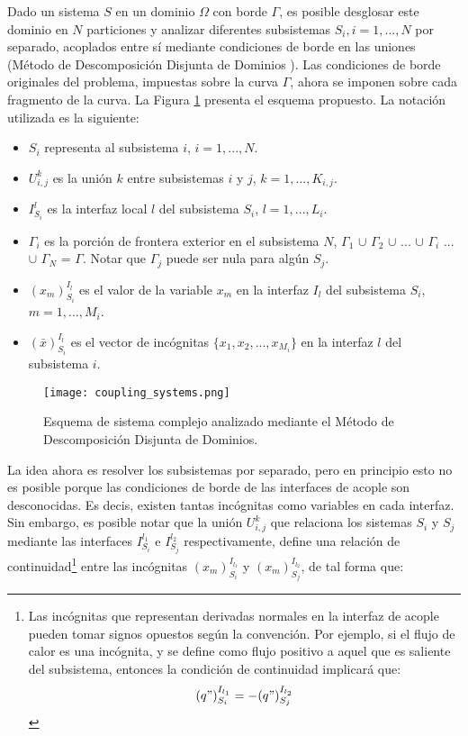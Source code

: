 Dado un sistema $S$ en un dominio $\Omega$ con borde $\Gamma$, es posible desglosar este dominio en $N$ particiones 
y analizar diferentes subsistemas $S_i,i=1,...,N$ por separado, acoplados entre sí mediante condiciones de borde en las uniones
(Método de Descomposición Disjunta de Dominios \cite{ddmethod}).
Las condiciones de borde originales del problema, impuestas sobre la curva $\Gamma$,
ahora se imponen sobre cada fragmento de la curva.
La Figura \ref{esquema-acoplamiento} presenta el esquema propuesto.
La notación utilizada es la siguiente:
\begin{itemize}
\item $S_i$ representa al subsistema $i$, $i=1,...,N$.
\item $U_{i,j}^k$ es la unión $k$ entre subsistemas $i$ y $j$, $k=1,...,K_{i,j}$.
\item $I_{S_i}^{l}$ es la interfaz local $l$ del subsistema $S_i$, $l=1,...,L_i$.
\item $\Gamma_i$ es la porción de frontera exterior en el subsistema $N$,
 $\Gamma_1$ $\cup$ $\Gamma_2$ $\cup$ ... $\cup$ $\Gamma_i$ ...  $\cup$ $\Gamma_N$ = $\Gamma$.
 Notar que $\Gamma_j$ puede ser nula para algún $S_j$.
\item ${(x_m)_{S_i}^{I_l}}$ es el valor de la variable $x_m$ en la interfaz ${I_l}$ del subsistema ${S_i}$, $m=1,...,M_i$.
\item ${(\bar{x})_{S_i}^{I_l}}$ es el vector de incógnitas $\{x_1,x_2,...,x_{M_i}\}$ en la interfaz ${l}$ del subsistema ${i}$.
\end{itemize}

\begin{figure}[ht]
\centering{}\texttt{[image: coupling\_systems.png]}
\caption[Esquema de sistema complejo analizado mediante el Método de Descomposición Disjunta de Dominios]
{Esquema de sistema complejo analizado mediante el Método de Descomposición Disjunta de Dominios.} 
\label{esquema-acoplamiento} 
\end{figure}
La idea ahora es resolver los subsistemas por separado, pero en principio esto no es posible porque las condiciones de borde de las interfaces de acople son desconocidas.
Es decis, existen tantas incógnitas como variables en cada interfaz.
Sin embargo, es posible notar que la unión $U_{i,j}^k$ que relaciona los sistemas $S_{i}$ y $S_{j}$ 
mediante las interfaces $I_{S_{i}}^{l_1}$ e $I_{S_{j}}^{l_2}$ respectivamente, 
define una relación de continuidad\footnote{
Las incógnitas que representan derivadas normales en la interfaz de acople pueden tomar signos opuestos según la convención.
Por ejemplo, si el flujo de calor es una incógnita, 
y se define como flujo positivo a aquel que es saliente del subsistema, 
entonces la condición de continuidad implicará que:
\begin{equation*}
{(q")_{S_i}^{I_{l_1}}}=-{(q")_{S_j}^{I_{l_2}}}
\label{continuidad-q}
\end{equation*}
} entre las incógnitas ${(x_m)_{S_i}^{I_{l_1}}}$ y ${(x_m)_{S_j}^{I_{l_2}}}$, de tal forma que:

